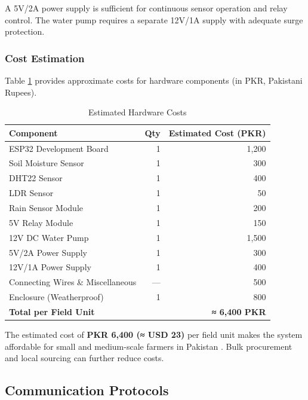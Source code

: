 A 5V/2A power supply is sufficient for continuous sensor operation 
and relay control. The water pump requires a separate 12V/1A supply 
with adequate surge protection.

\subsubsection{Cost Estimation}

Table \ref{tab:cost-estimate} provides approximate costs for 
hardware components (in PKR, Pakistani Rupees).

\begin{table}[!htbp]
\centering
\caption{Estimated Hardware Costs}
\label{tab:cost-estimate}
\begin{tabular}{|p{}|r|r|}
\hline
\textbf{Component} & \textbf{Qty} & 
\textbf{Estimated Cost (PKR)} \\
\hline
ESP32 Development Board & 1 & 1,200 \\
\hline
Soil Moisture Sensor & 1 & 300 \\
\hline
DHT22 Sensor & 1 & 400 \\
\hline
LDR Sensor & 1 & 50 \\
\hline
Rain Sensor Module & 1 & 200 \\
\hline
5V Relay Module & 1 & 150 \\
\hline
12V DC Water Pump & 1 & 1,500 \\
\hline
5V/2A Power Supply & 1 & 300 \\
\hline
12V/1A Power Supply & 1 & 400 \\
\hline
Connecting Wires \& Miscellaneous & --- & 500 \\
\hline
Enclosure (Weatherproof) & 1 & 800 \\
\hline
\textbf{Total per Field Unit} &  & \textbf{≈ 6,400 PKR} \\
\hline
\end{tabular}
\end{table}

\FloatBarrier

The estimated cost of \textbf{PKR 6,400 (≈ USD 23)} per field unit 
makes the system affordable for small and medium-scale farmers in 
Pakistan \cite{shafi2019precision}. Bulk procurement and local 
sourcing can further reduce costs.

\subsection{Communication Protocols}
\label{sec:protocols}


